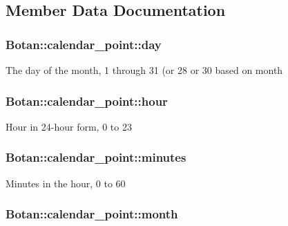 \subsection{Member Data Documentation}
\hypertarget{structBotan_1_1calendar__point_afa98f14c13f0795ab64f6264759b3939}{
\subsubsection[{day}]{ Botan\-::calendar\-\_\-point\-::day}}\label{structBotan_1_1calendar__point_afa98f14c13f0795ab64f6264759b3939}
The day of the month, 1 through 31 (or 28 or 30 based on month \hypertarget{structBotan_1_1calendar__point_afbbacded732cbe93ef9b5a9140ff980d}{
\subsubsection[{hour}]{ Botan\-::calendar\-\_\-point\-::hour}}\label{structBotan_1_1calendar__point_afbbacded732cbe93ef9b5a9140ff980d}
Hour in 24-\/hour form, 0 to 23 \hypertarget{structBotan_1_1calendar__point_a1288746b8c0073443cbfdbc0e73e98d4}{
\subsubsection[{minutes}]{ Botan\-::calendar\-\_\-point\-::minutes}}\label{structBotan_1_1calendar__point_a1288746b8c0073443cbfdbc0e73e98d4}
Minutes in the hour, 0 to 60 \hypertarget{structBotan_1_1calendar__point_a8c95b2bb64c9ca1b7782d464c88a3c67}{
\subsubsection[{month}]{ Botan\-::calendar\-\_\-point\-::month}}\label{structBotan_1_1calendar__point_a8c95b2bb64c9ca1b7782d464c88a3c67}
